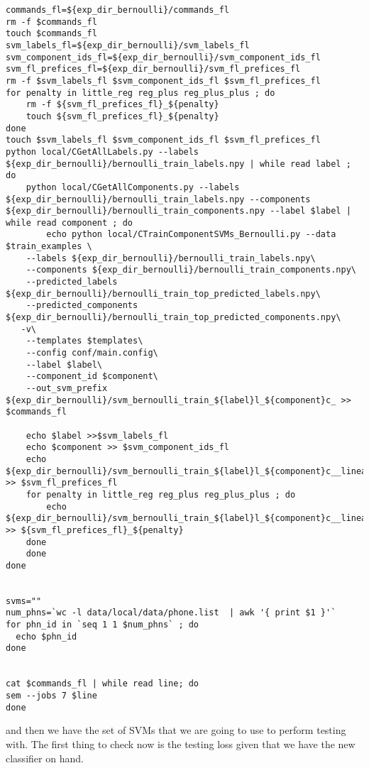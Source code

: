 \documentclass{article}
\begin{document}
\begin{verbatim}
commands_fl=${exp_dir_bernoulli}/commands_fl
rm -f $commands_fl
touch $commands_fl
svm_labels_fl=${exp_dir_bernoulli}/svm_labels_fl
svm_component_ids_fl=${exp_dir_bernoulli}/svm_component_ids_fl
svm_fl_prefices_fl=${exp_dir_bernoulli}/svm_fl_prefices_fl
rm -f $svm_labels_fl $svm_component_ids_fl $svm_fl_prefices_fl
for penalty in little_reg reg_plus reg_plus_plus ; do
    rm -f ${svm_fl_prefices_fl}_${penalty}
    touch ${svm_fl_prefices_fl}_${penalty}
done
touch $svm_labels_fl $svm_component_ids_fl $svm_fl_prefices_fl
python local/CGetAllLabels.py --labels ${exp_dir_bernoulli}/bernoulli_train_labels.npy | while read label ; do
    python local/CGetAllComponents.py --labels ${exp_dir_bernoulli}/bernoulli_train_labels.npy --components ${exp_dir_bernoulli}/bernoulli_train_components.npy --label $label | while read component ; do
        echo python local/CTrainComponentSVMs_Bernoulli.py --data $train_examples \
    --labels ${exp_dir_bernoulli}/bernoulli_train_labels.npy\
    --components ${exp_dir_bernoulli}/bernoulli_train_components.npy\
    --predicted_labels ${exp_dir_bernoulli}/bernoulli_train_top_predicted_labels.npy\
    --predicted_components ${exp_dir_bernoulli}/bernoulli_train_top_predicted_components.npy\
   -v\
    --templates $templates\
    --config conf/main.config\
    --label $label\
    --component_id $component\
    --out_svm_prefix ${exp_dir_bernoulli}/svm_bernoulli_train_${label}l_${component}c_ >> $commands_fl

    echo $label >>$svm_labels_fl
    echo $component >> $svm_component_ids_fl
    echo ${exp_dir_bernoulli}/svm_bernoulli_train_${label}l_${component}c__linear_reg_plus_plus >> $svm_fl_prefices_fl
    for penalty in little_reg reg_plus reg_plus_plus ; do
        echo ${exp_dir_bernoulli}/svm_bernoulli_train_${label}l_${component}c__linear_${penalty} >> ${svm_fl_prefices_fl}_${penalty}
    done 
    done
done


svms=""
num_phns=`wc -l data/local/data/phone.list  | awk '{ print $1 }'`
for phn_id in `seq 1 1 $num_phns` ; do
  echo $phn_id
done


cat $commands_fl | while read line; do
sem --jobs 7 $line
done
\end{verbatim}
and then we have the set of SVMs that we are going to use
to perform testing with.  The first thing to check now is the testing
loss given that we have the new classifier on hand.
\end{document}
